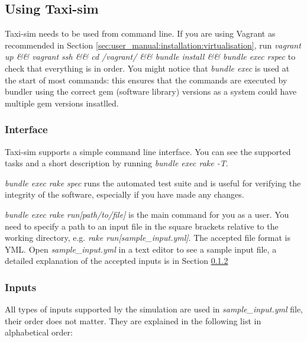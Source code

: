 \subsection{Using Taxi-sim}
\label{sec:user_manual:using}

Taxi-sim needs to be used from command line. If you are using Vagrant as
recommended in Section \ref{sec:user_manual:installation:virtualisation}, run
\textit{vagrant up \&\& vagrant ssh \&\& cd /vagrant/ \&\& bundle install \&\&
bundle exec rspec} to check that everything is in order. You might notice that
\textit{bundle exec} is used at the start of most commands: this ensures that
the commands are executed by bundler using the correct gem (software library)
versions as a system could have multiple gem versions insatlled.


\subsubsection{Interface}
\label{sec:user_manual:using:interface}

Taxi-sim supports a simple command line interface. You can see the supported
tasks and a short description by running \textit{bundle exec rake -T}.

\textit{bundle exec rake spec} runs the automated test suite and is useful for
verifying the integrity of the software, especially if you have made any
changes.

\textit{bundle exec rake run[path/to/file]} is the main command for you as a
user. You need to specify a path to an input file in the square brackets
relative to the working directory, e.g. \textit{rake run[sample\_input.yml]}.
The accepted file format is YML. Open \textit{sample\_input.yml} in a text
editor to see a sample input file, a detailed explanation of the accepted
inputs is in Section \ref{sec:user_manual:using:inputs}


\subsubsection{Inputs}
\label{sec:user_manual:using:inputs}

All types of inputs supported by the simulation are used in
\textit{sample\_input.yml} file, their order does not matter. They are explained
in the following list in alphabetical order:

